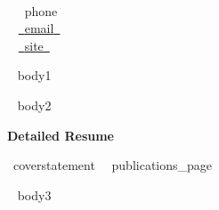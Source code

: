 \documentclass[a4paper]{article}
\newcommand{\block}[1]{\hrule \vspace{0.2cm} \textbf{\Large #1} \vspace{0.2cm}}
\newcommand{\blockNp}[1]{\newpage \textbf{\Large #1} \vspace{0.2cm}}
\newcommand{\skill}[2]{\textbf{#1} \hfill #2 \\}
\begin{document}
\begin{minipage}[c]{0.6\columnwidth}
    \\
\end{minipage} 
\hfill
\begin{minipage}[t]{0.35\columnwidth}
    \skill{\faPhone~}{~{{phone}}~}
    \skill{\faEnvelope~}{\href{mailto:~{{email}}~}{~{{email}}~}}
    \skill{\faGlobe~}{\href{~{{site}}~}{~{{site}}~}}
\end{minipage}
\vspace{-0.25em}

\begin{minipage}[t]{0.6\columnwidth}
    ~{{ body1 }}~
\end{minipage} 
\hfill
\begin{minipage}[t]{0.375\columnwidth}
    ~{{ body2 }}~
\end{minipage}




\blockNp{Detailed Resume}

{~{{coverstatement}}~}
\vspace{1em}
{~{{publications_page}}~}

\vspace{1em}


~{{ body3 }}~
\end{document}
